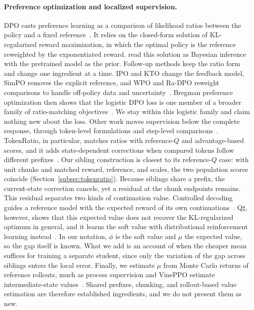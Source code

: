 \documentclass[pdflatex,sn-mathphys-num,review]{sn-jnl}
\theoremstyle{thmstyleone}
\theoremstyle{thmstyletwo}
\theoremstyle{thmstylethree}
\begin{document}
\paragraph{Preference optimization and localized supervision.}
DPO casts preference learning as a comparison of likelihood ratios between the policy and a fixed reference~\citep{rafailov2023direct}. It relies on the closed-form solution of KL-regularized reward maximization, in which the optimal policy is the reference reweighted by the exponentiated reward. \citet{korbak2022rl} read this solution as Bayesian inference with the pretrained model as the prior. Follow-up methods keep the ratio form and change one ingredient at a time. IPO and KTO change the feedback model, SimPO removes the explicit reference, and WPO and Ra-DPO reweight comparisons to handle off-policy data and uncertainty~\citep{azar2024general,ethayarajh2024kto,meng2024simpo,zhou2024wpo,zhang2025radpo}. Bregman preference optimization then shows that the logistic DPO loss is one member of a broader family of ratio-matching objectives~\citep{kim2026preference}. We stay within this logistic family and claim nothing new about the loss. Other work moves supervision below the complete response, through token-level formulations and step-level comparisons~\citep{rafailov2024from,zeng2024token,lai2024step}. TokenRatio, in particular, matches ratios with reference-$Q$ and advantage-based scores, and it adds state-dependent corrections when compared tokens follow different prefixes~\citep{nguyen2026tokenratio}. Our sibling construction is closest to its reference-$Q$ case: with unit chunks and matched reward, reference, and scales, the two population scores coincide (Section~\ref{subsec:tokenratio}). Because siblings share a prefix, the current-state correction cancels, yet a residual at the chunk endpoints remains. This residual separates two kinds of continuation value. Controlled decoding guides a reference model with the expected reward of its own continuations~\citep{mudgal2024controlled}. Q$\sharp$, however, shows that this expected value does not recover the KL-regularized optimum in general, and it learns the soft value with distributional reinforcement learning instead~\citep{zhou2025qsharp}. In our notation, $\phi$ is the soft value and $\mu$ the expected value, so the gap itself is known. What we add is an account of when the cheaper mean suffices for training a separate student, since only the variation of the gap across siblings enters the local error. Finally, we estimate $\mu$ from Monte Carlo returns of reference rollouts, much as process supervision and VinePPO estimate intermediate-state values~\citep{wang2024mathshepherd,kazemnejad2025vineppo}. Shared prefixes, chunking, and rollout-based value estimation are therefore established ingredients, and we do not present them as new.
\end{document}
